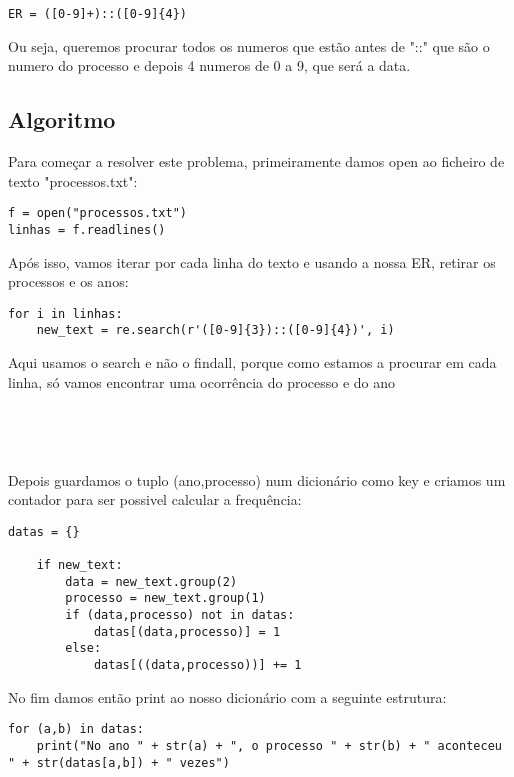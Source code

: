 \documentclass[11pt,a4paper]{report}%
\begin{document}
\begin{verbatim}
ER = ([0-9]+)::([0-9]{4})
\end{verbatim}

Ou seja, queremos procurar todos os numeros que estão antes de "::" que são o numero do processo e depois 4 numeros de 0 a 9, que será a data.\\

\subsection{Algoritmo}

Para começar a resolver este problema, primeiramente damos open ao ficheiro de texto "processos.txt":

\begin{verbatim}
f = open("processos.txt")
linhas = f.readlines()
\end{verbatim}

Após isso, vamos iterar por cada linha do texto e usando a nossa ER, retirar os processos e os anos:

\begin{verbatim}
for i in linhas:
    new_text = re.search(r'([0-9]{3})::([0-9]{4})', i)
\end{verbatim}

Aqui usamos o search e não o findall, porque como estamos a procurar em cada linha, só vamos encontrar uma ocorrência do processo e do ano
\\
\\
\\
\\
\\
Depois guardamos o tuplo (ano,processo) num dicionário como key e criamos um contador para ser possivel calcular a frequência:

\begin{verbatim}
datas = {}

    if new_text:
        data = new_text.group(2)
        processo = new_text.group(1)
        if (data,processo) not in datas: 
            datas[(data,processo)] = 1 
        else: 
            datas[((data,processo))] += 1 
\end{verbatim}

No fim damos então print ao nosso dicionário com a seguinte estrutura:

\begin{verbatim}
for (a,b) in datas: 
    print("No ano " + str(a) + ", o processo " + str(b) + " aconteceu " + str(datas[a,b]) + " vezes")
\end{verbatim}
\end{document}
